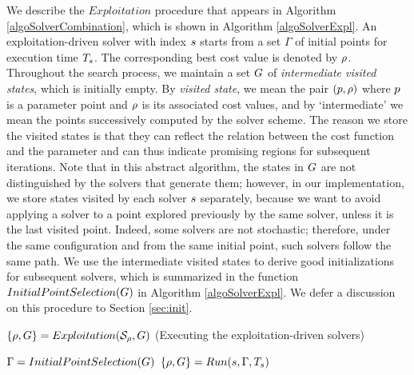 We describe the $Exploitation$ procedure that appears in Algorithm \ref{algoSolverCombination}, which is shown in Algorithm \ref{algoSolverExpl}. 
An exploitation-driven solver with index $s$ starts from a set $\Gamma$ of initial points for execution time $T_{s}$. The corresponding best cost value is denoted by $\rho$. Throughout the search process, we maintain a set $G$ of {\em intermediate visited states}, which is initially empty. By {\em visited state}, we mean the pair $(p, \rho)$ where $p$ is a parameter point and $\rho$ is its associated cost values, and by `intermediate' we mean the points successively computed by the solver scheme. The reason we store the visited states is that they can reflect the relation between the cost function and the parameter and can thus indicate promising regions for subsequent iterations. Note that in this abstract algorithm, the states in $G$ are not distinguished by the solvers that generate them; however, in our implementation, we store states visited by each solver $s$ separately, because we want to avoid applying a solver to a point explored previously by the same solver, unless it is the last visited point. Indeed, some solvers are not stochastic; therefore, under the same configuration and from the same initial point, such solvers follow the same path. We use the intermediate visited states to derive good initializations for subsequent solvers, which is summarized in the function $InitialPointSelection(G)$ in Algorithm \ref{algoSolverExpl}. We defer a discussion on this procedure to Section \ref{sec:init}.

\begin{algorithm}
\caption{$\{ \rho, G \}=Exploitation(\mathcal{S_{\rho}}, G)$ 
(Executing the exploitation-driven solvers) \label{algoSolverExpl}}
\begin{algorithmic}
		\State {}
		\ForAll{$\solver \in \solversetRho$} 
		\State $\Gamma = InitialPointSelection(G)$
		\State {}
  		\State $\{ \rho, G \} = Run(s, \Gamma, T_{s})$ 
		\EndFor
\end{algorithmic}
\end{algorithm}


